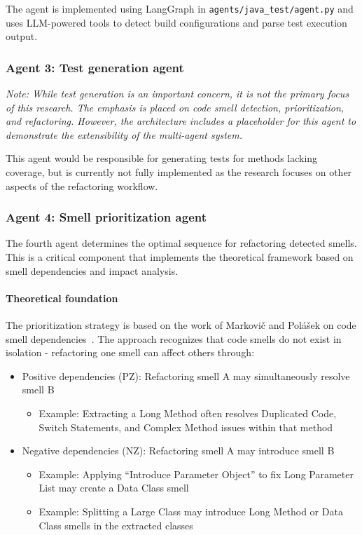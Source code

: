 The agent is implemented using LangGraph in \texttt{agents/java\_test/agent.py} and uses LLM-powered tools to detect build configurations and parse test execution output.

\subsubsection{Agent 3: Test generation agent}

\textit{Note: While test generation is an important concern, it is not the primary focus of this research. The emphasis is placed on code smell detection, prioritization, and refactoring. However, the architecture includes a placeholder for this agent to demonstrate the extensibility of the multi-agent system.}

This agent would be responsible for generating tests for methods lacking coverage, but is currently not fully implemented as the research focuses on other aspects of the refactoring workflow.

\subsubsection{Agent 4: Smell prioritization agent}

The fourth agent determines the optimal sequence for refactoring detected smells. This is a critical component that implements the theoretical framework based on smell dependencies and impact analysis.

\paragraph{Theoretical foundation}

The prioritization strategy is based on the work of Markovič and Polášek on code smell dependencies~\cite{markovic2016refaktorovanie}. The approach recognizes that code smells do not exist in isolation - refactoring one smell can affect others through:

\begin{itemize}
    \item Positive dependencies (PZ): Refactoring smell A may simultaneously resolve smell B
    \begin{itemize}
        \item Example: Extracting a Long Method often resolves Duplicated Code, Switch Statements, and Complex Method issues within that method
    \end{itemize}
    \item Negative dependencies (NZ): Refactoring smell A may introduce smell B
    \begin{itemize}
        \item Example: Applying ``Introduce Parameter Object'' to fix Long Parameter List may create a Data Class smell
        \item Example: Splitting a Large Class may introduce Long Method or Data Class smells in the extracted classes
    \end{itemize}
\end{itemize}

